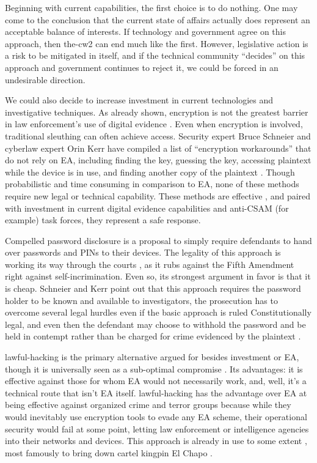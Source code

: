 Beginning with current capabilities, the first choice is to do nothing. One may come to the conclusion that the current
state of affairs actually does represent an acceptable balance of interests. If technology and government agree on this
approach, then \ac{the-cw2} can end much like the first. However, legislative action is a risk to be mitigated in
itself, and if the technical community ``decides'' on this approach and government continues to reject it, we could be
forced in an undesirable direction.

We could also decide to increase investment in current technologies and investigative techniques. As already shown,
encryption is not the greatest barrier in law enforcement's use of digital evidence \cite{carter_2018}. Even when
encryption is involved, traditional sleuthing can often achieve access. Security expert Bruce Schneier and cyberlaw
expert Orin Kerr have compiled a list of ``encryption workarounds'' that do not rely on \ac{EA}, including finding the
key, guessing the key, accessing plaintext while the device is in use, and finding another copy of the plaintext
\cite{kerr_encryption_2017}. Though probabilistic and time consuming in comparison to \ac{EA}, none of these methods
require new legal or technical capability. These methods are effective \cite{greenberg_2018}, and paired with investment
in current digital evidence capabilities and anti-\ac{CSAM} (for example) task forces, they represent a safe response.

Compelled password disclosure is a proposal to simply require defendants to hand over passwords and \acp{PIN} to their
devices. The legality of this approach is working its way through the courts \cite{bittenbender_2019} \cite{sobel_2019},
as it rubs against the Fifth Amendment right against self-incrimination. Even so, its strongest argument in favor is
that it is cheap. Schneier and Kerr point out that this approach requires the password holder to be known and available
to investigators, the prosecution has to overcome several legal hurdles even if the basic approach is ruled
Constitutionally legal, and even then the defendant may choose to withhold the password and be held in contempt rather
than be charged for crime evidenced by the plaintext \cite{kerr_encryption_2017}.

\Ac{lawful-hacking} is the primary alternative argued for besides investment or \ac{EA}, though it is universally seen
as a sub-optimal compromise \cite{bellovin_lawful_2013} \cite{hennessey_lawful_2016} \cite{rozenshtein_wicked_2018}
\cite{kerr_encryption_2017} \cite{soesanto_2018}. Its advantages: it is effective against those for whom \ac{EA} would
not necessarily work, and, well, it's a technical route that isn't \ac{EA} itself. \Ac{lawful-hacking} has the advantage
over \ac{EA} at being effective against organized crime and terror groups because while they would inevitably use
encryption tools to evade any \ac{EA} scheme, their operational security would fail at some point, letting law
enforcement or intelligence agencies into their networks and devices. This approach is already in use to some extent
\cite{cox_2020}, most famously to bring down cartel kingpin El Chapo \cite{feuer_chapo_2019}.

